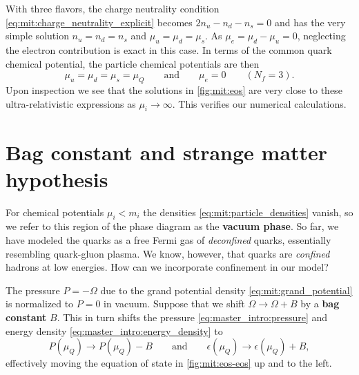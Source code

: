 With three flavors, the charge neutrality condition \eqref{eq:mit:charge_neutrality_explicit} becomes $2 n_u - n_d - n_s = 0$
and has the very simple solution $n_u = n_d = n_s$ and $\mu_u = \mu_d = \mu_s$.
As $\mu_e = \mu_d - \mu_u = 0$, neglecting the electron contribution is exact in this case.
In terms of the common quark chemical potential, the particle chemical potentials are then
\begin{equation}
	\mu_u = \mu_d = \mu_s = \mu_Q
	\qquad \text{and} \qquad
	\mu_e = 0
	\qquad (N_f = 3) .
\label{eq:mit:chemical_potentials_massless_3f}
\end{equation}
Upon inspection we see that the solutions in \cref{fig:mit:eos} are very close to these ultra-relativistic expressions as $\mu_i \rightarrow \infty$.
This verifies our numerical calculations.

\section{Bag constant and strange matter hypothesis}

For chemical potentials $\mu_i < m_i$ the densities \eqref{eq:mit:particle_densities} vanish,
so we refer to this region of the phase diagram as the \textbf{vacuum phase}.
So far, we have modeled the quarks as a free Fermi gas of \emph{deconfined} quarks, essentially resembling quark-gluon plasma.
We know, however, that quarks are \emph{confined} hadrons at low energies.
How can we incorporate confinement in our model?

The pressure $P = -\Omega$ due to the grand potential density \eqref{eq:mit:grand_potential} is normalized to $P = 0$ in vacuum.
Suppose that we shift $\Omega \rightarrow \Omega + B$ by a \textbf{bag constant} $B$.
This in turn shifts the pressure \eqref{eq:master_intro:pressure} and energy density \eqref{eq:master_intro:energy_density} to
\begin{equation}
	P(\mu_Q) \rightarrow P(\mu_Q) - B
	\qquad \text{and} \qquad
	\epsilon(\mu_Q) \rightarrow \epsilon(\mu_Q) + B,
\label{eq:mit:bag_shift}
\end{equation}
effectively moving the equation of state in \cref{fig:mit:eos-eos} up and to the left.

